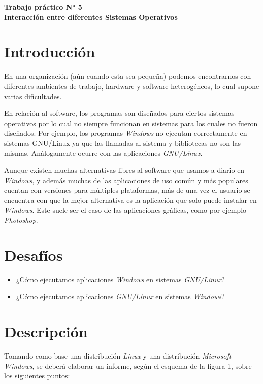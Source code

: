\documentclass[12pt]{article}
\def\maketitle{

    \makeatletter
    {\color{bl} \centering \huge \sc \textbf{
    Trabajo práctico N° 5\\ Interacción entre diferentes Sistemas Operativos
    \large \vspace*{-8pt} \color{black} 
    \vspace*{8pt} }\par}
    \makeatother

    \makeatletter
    
}
\begin{document}
\thispagestyle{empty}
\maketitle
\setlength{\parindent}{0pt}

\section*{Introducción}

En una organización (aún cuando esta sea pequeña) podemos encontrarnos con
diferentes ambientes de trabajo, hardware y software heterogéneos, lo cual
supone varias dificultades.

En relación al software, los programas son diseñados para ciertos sistemas
operativos por lo cual no siempre funcionan en sistemas para los cuales no
fueron diseñados. Por ejemplo, los programas \emph{Windows} no ejecutan
correctamente en sistemas GNU/Linux ya que las llamadas al sistema y
bibliotecas no son las mismas. Análogamente ocurre con las aplicaciones
\emph{GNU/Linux}.

Aunque existen muchas alternativas libres al software que usamos a diario en
\emph{Windows}, y además muchas de las aplicaciones de uso común y más
populares cuentan con versiones para múltiples plataformas, más de una vez el
usuario se encuentra con que la mejor alternativa es la aplicación que solo
puede instalar en \emph{Windows}. Este suele ser el caso de las aplicaciones
gráficas, como por ejemplo \emph{Photoshop}.

\section*{Desafíos}

\begin{itemize}

    \item ¿Cómo ejecutamos aplicaciones \emph{Windows} en sistemas
        \emph{GNU/Linux}?

    \item ¿Cómo ejecutamos aplicaciones \emph{GNU/Linux} en sistemas
        \emph{Windows}?

\end{itemize}

\section*{Descripción}

Tomando como base una distribución \emph{Linux} y una distribución
\emph{Microsoft Windows}, se deberá elaborar un informe, según el esquema de la figura 1, sobre los siguientes puntos:
\end{document}
